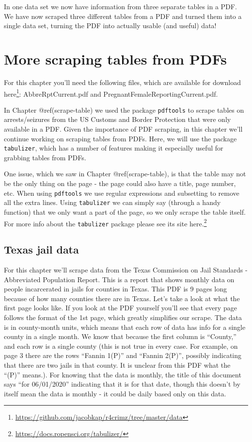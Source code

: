 \documentclass[
  a4paper,
]{krantz}
\renewcommand{\href}[2]{#2\footnote{\url{#1}}}
\begin{document}
In one data set we now have information from three separate
tables in a PDF. We have now scraped three different tables
from a PDF and turned them into a single data set, turning
the PDF into actually usable (and useful) data!

\hypertarget{scrape-table2}{%
\chapter{More scraping tables from
PDFs}\label{scrape-table2}}

For this chapter you'll need the following files, which are
available for download
\href{https://github.com/jacobkap/r4crimz/tree/master/data}{here}:
AbbreRptCurrent.pdf and PregnantFemaleReportingCurrent.pdf.

In Chapter @ref(scrape-table) we used the package
\texttt{pdftools} to scrape tables on arrests/seizures from
the US Customs and Border Protection that were only
available in a PDF. Given the importance of PDF scraping, in
this chapter we'll continue working on scraping tables from
PDFs. Here, we will use the package \texttt{tabulizer},
which has a number of features making it especially useful
for grabbing tables from PDFs.

One issue, which we saw in Chapter @ref(scrape-table), is
that the table may not be the only thing on the page - the
page could also have a title, page number, etc. When using
\texttt{pdftools} we use regular expressions and subsetting
to remove all the extra lines. Using \texttt{tabulizer} we
can simply say (through a handy function) that we only want
a part of the page, so we only scrape the table itself. For
more info about the \texttt{tabulizer} package please see
its site \href{https://docs.ropensci.org/tabulizer/}{here.}

\hypertarget{texas-jail-data}{%
\section{Texas jail data}\label{texas-jail-data}}

For this chapter we'll scrape data from the Texas Commission
on Jail Standards - Abbreviated Population Report. This is a
report that shows monthly data on people incarcerated in
jails for counties in Texas. This PDF is 9 pages long
because of how many counties there are in Texas. Let's take
a look at what the first page looks like. If you look at the
PDF yourself you'll see that every page follows the format
of the 1st page, which greatly simplifies our scrape. The
data is in county-month units, which means that each row of
data has info for a single county in a single month. We know
that because the first column is ``County,'' and each row is
a single county (this is not true in every case. For
example, on page 3 there are the rows ``Fannin 1(P)'' and
``Fannin 2(P)'', possibly indicating that there are two
jails in that county. It is unclear from this PDF what the
``(P)'' means.). For knowing that the data is monthly, the
title of this document says ``for 06/01/2020'' indicating
that it is for that date, though this doesn't by itself mean
the data is monthly - it could be daily based only on this
data.
\end{document}
